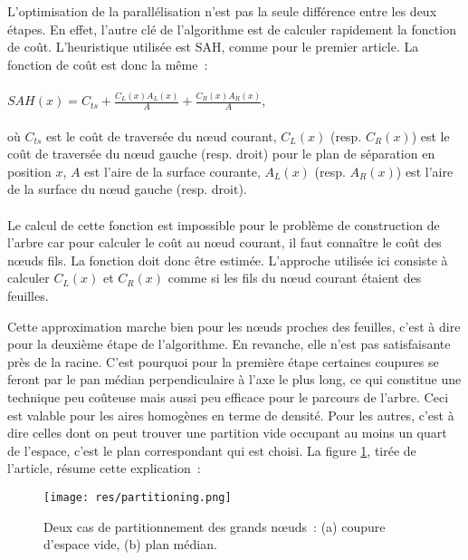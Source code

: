 \documentclass[a4paper]{article}
\begin{document}
L'optimisation de la parallélisation n'est pas la seule différence entre les deux étapes. En effet, l'autre clé de l'algorithme est de calculer rapidement la fonction de coût. L'heuristique utilisée est SAH, comme pour le premier article. La fonction de coût est donc la même~:
\\\\
$SAH(x) = C_{ts} + \frac{C_L(x)A_L(x)}{A} + \frac{C_R(x)A_R(x)}{A}$,
\\\\
où $C_{ts}$ est le coût de traversée du nœud courant, $C_L(x)$ (resp. $C_R(x)$) est le coût de traversée du nœud gauche (resp. droit) pour le plan de séparation en position $x$, $A$ est l'aire de la surface courante, $A_L(x)$ (resp. $A_R(x)$) est l'aire de la surface du nœud gauche (resp. droit).
\\\\
Le calcul de cette fonction est impossible pour le problème de construction de l'arbre car pour calculer le coût au nœud courant, il faut connaître le coût des nœuds fils. La fonction doit donc être estimée. L'approche utilisée ici consiste à calculer $C_L(x)$ et $C_R(x)$ comme si les fils du nœud courant étaient des feuilles.

Cette approximation marche bien pour les nœuds proches des feuilles, c'est à dire pour la deuxième étape de l'algorithme. En revanche, elle n'est pas satisfaisante près de la racine. C'est pourquoi pour la première étape certaines coupures se feront par le pan médian perpendiculaire à l'axe le plus long, ce qui constitue une technique peu coûteuse mais aussi peu efficace pour le parcours de l'arbre. Ceci est valable pour les aires homogènes en terme de densité. Pour les autres, c'est à dire celles dont on peut trouver une partition vide occupant au moins un quart de l'espace, c'est le plan correspondant qui est choisi. La figure \ref{fig:partition}, tirée de l'article, résume cette explication~:

\begin{figure}[!h]
\centering
\texttt{[image: res/partitioning.png]}
\caption{\label{fig:partition}Deux cas de partitionnement des grands nœuds~: (a) coupure d'espace vide, (b) plan médian.}
\end{figure}

\end{document}
